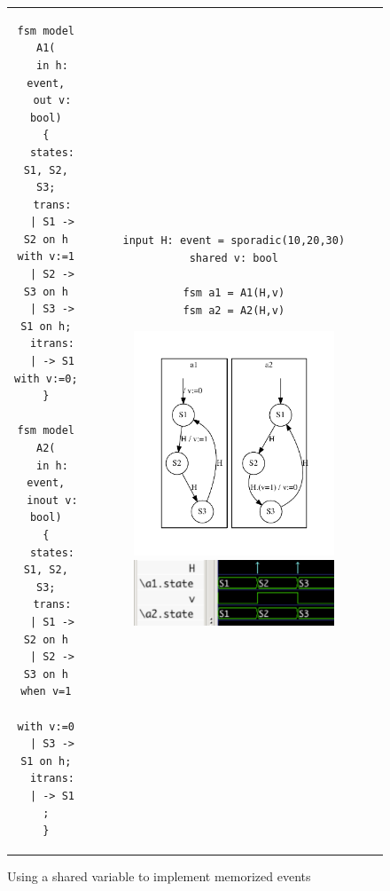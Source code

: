 \begin{figure}[h]
  \centering
\begin{tabular}[c]{cc}
  \begin{minipage}[b]{0.4\linewidth}
  \begin{lstlisting}[language=Rfsm]
fsm model A1(
  in h: event,
  out v: bool)
{
  states: S1, S2, S3;
  trans:
  | S1 -> S2 on h with v:=1
  | S2 -> S3 on h
  | S3 -> S1 on h;
  itrans:
  | -> S1 with v:=0;
}

fsm model A2(
  in h: event,
  inout v: bool)
{
  states: S1, S2, S3;
  trans:
  | S1 -> S2 on h
  | S2 -> S3 on h when v=1
                  with v:=0
  | S3 -> S1 on h;
  itrans:
  | -> S1 ;
}
  \end{lstlisting}
  \end{minipage} &
  \begin{minipage}[b]{0.6\linewidth}
\begin{lstlisting}[language=Rfsm]
input H: event = sporadic(10,20,30)
shared v: bool

fsm a1 = A1(H,v)
fsm a2 = A2(H,v)
\end{lstlisting}
\includegraphics[width=0.7\textwidth]{figs/sync-sv2-model}
\includegraphics[width=0.7\textwidth]{figs/sync-sv2-chrono}
  \end{minipage}
\end{tabular}
  \caption{Using a shared variable to implement memorized events}
  \label{fig:sync-sv2}
\end{figure}

